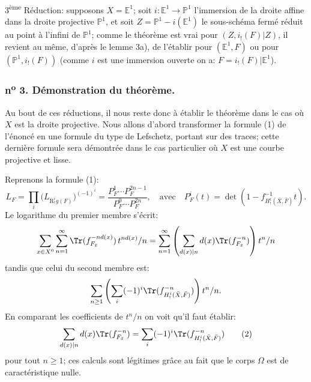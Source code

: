 3\textsuperscript{ème} Réduction: supposons $X=\mathbb{E}^1$; soit $i:\mathbb{E}^1\to\mathbb{P}^1$ l'immersion de la droite affine dans la droite projective $\mathbb{P}^1$, et soit $Z=\mathbb{P}^1-i(\mathbb{E}^1)$ le sous-schéma fermé réduit au point à l'infini de $\mathbb{P}^1$; comme le théorème est vrai pour $(Z,i_!(F)|Z)$, il revient au même, d'après le lemme 3a), de l'établir pour $(\mathbb{E}^1,F)$ ou pour $(\mathbb{P}^1,i_!(F))$ (comme $i$ est une immersion ouverte on a: $F=i_!(F)|\mathbb{E}^1$).

\subsubsection*{n\textsuperscript{o} 3. Démonstration du théorème.}

Au bout de ces réductions, il nous reste donc à établir le théorème dans le cas où $X$ est la droite projective. Nous allons d'abord transformer la formule (1) de l'énoncé en une formule du type de Lefschetz, portant sur des traces; cette dernière formule sera démontrée dans le cas particulier où $X$ est une courbe projective et lisse.

Reprenons la formule (1):
\[
L_F=\prod_i\bigl(L_{\mathrm{R}^i_!g(F)}\bigr)^{(-1)^i}
=\frac{P_F^1\cdots P_F^{2n-1}}{P_F^0\cdots P_F^{2n}},
\quad\text{avec}\quad
P_F^i(t)=\det(1-f^{-1}_{H^i_!(\bar X,\bar F)}t).
\]
Le logarithme du premier membre s'écrit:
\[
\sum_{x\in X^0}\sum_{n=1}^{\infty}\Tr(f_{F_{\bar x}}^{-n d(x)})\,t^{n d(x)}/n
=\sum_{n=1}^{\infty}\left(\sum_{d(x)|n} d(x)\Tr(f_{F_{\bar x}}^{-n})\right)t^n/n
\]
tandis que celui du second
membre est:
\[
\sum_{n\ge1}\left(\sum_i(-1)^i\Tr(f^{-n}_{H^i_!(\bar X,\bar F)})\right)t^n/n.
\]
En comparant les coefficients de $t^n/n$ on voit qu'il faut établir:
\[
\sum_{d(x)|n}d(x)\Tr(f_{F_{\bar x}}^{-n})
=\sum_i(-1)^i\Tr(f^{-n}_{H^i_!(\bar X,\bar F)})
\tag{2}
\]
pour tout $n\ge1$; ces calculs sont légitimes grâce au fait que le corps $\Omega$ est de caractéristique nulle.

